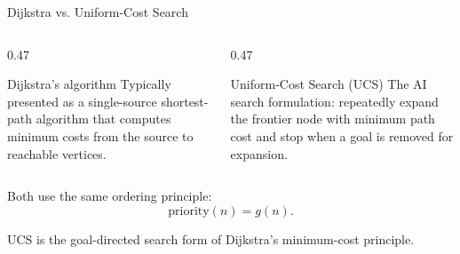 \documentclass[aspectratio=169,10pt]{beamer}
\begin{document}
\begin{frame}[shrink=20]{Dijkstra vs. Uniform-Cost Search}
  \begin{columns}[T,onlytextwidth]
    \begin{column}{0.47\textwidth}
      \begin{block}{Dijkstra's algorithm}
        Typically presented as a single-source shortest-path algorithm that computes minimum costs from the source to reachable vertices.
      \end{block}
    \end{column}

    \begin{column}{0.47\textwidth}
      \begin{block}{Uniform-Cost Search (UCS)}
        The AI search formulation: repeatedly expand the frontier node with minimum path cost and stop when a goal is removed for expansion.
      \end{block}
    \end{column}
  \end{columns}

  Both use the same ordering principle:
  \[
    \text{priority}(n)=g(n).
  \]

  \begin{keyidea}
    UCS is the goal-directed search form of Dijkstra's minimum-cost principle.
  \end{keyidea}
\end{frame}
\end{document}
